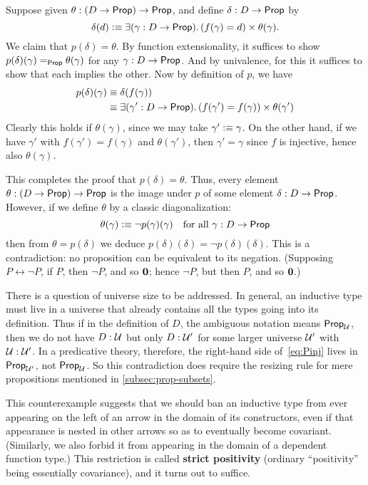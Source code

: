 Suppose given $\theta:(D\to\mathsf{Prop})\to\mathsf{Prop}$, and define $\delta:D\to\mathsf{Prop}$ by
\begin{equation}
  \delta(d) \defeq \exis{\gamma:D\to\prop} (f(\gamma) = d) \times \theta(\gamma).\label{eq:Pinj}
\end{equation}
We claim that $p(\delta)=\theta$.
By function extensionality, it suffices to show $p(\delta)(\gamma) =_\mathsf{Prop} \theta(\gamma)$ for any $\gamma:D\to\mathsf{Prop}$.
And by univalence, for this it suffices to show that each implies the other.
Now by definition of $p$, we have
\begin{align*}
  p(\delta)(\gamma) &\jdeq \delta(f(\gamma))\\
  &\jdeq \exis{\gamma':D\to\prop} (f(\gamma') = f(\gamma)) \times \theta(\gamma')
\end{align*}
Clearly this holds if $\theta(\gamma)$, since we may take $\gamma'\vcentcolon\equiv \gamma$.
On the other hand, if we have $\gamma'$ with $f(\gamma') = f(\gamma)$ and $\theta(\gamma')$, then $\gamma'=\gamma$ since $f$ is injective, hence also $\theta(\gamma)$.

This completes the proof that $p(\delta)=\theta$.
Thus, every element $\theta:(D\to\mathsf{Prop})\to\mathsf{Prop}$ is the image under $p$ of some element $\delta:D\to\mathsf{Prop}$.
However, if we define $\theta$ by a classic diagonalization:
\[ \theta(\gamma) \vcentcolon\equiv \neg p(\gamma)(\gamma) \quad\text{for all $\gamma:D\to\mathsf{Prop}$} \]
then from $\theta = p(\delta)$ we deduce $p(\delta)(\delta) = \neg p(\delta)(\delta)$.
This is a contradiction: no proposition can be equivalent to its negation.
(Supposing $P\leftrightarrow \neg P$, if $P$, then $\neg P$, and so $\mathbf{0}$; hence $\neg P$, but then $P$, and so $\mathbf{0}$.)

\begin{rmk}
  There is a question of universe size to be addressed.
  In general, an inductive type must live in a universe that already contains all the types going into its definition.
  Thus if in the definition of $D$, the ambiguous notation \prop means $\mathsf{Prop}_{\mathcal{U}}$, then we do not have $D:\mathcal{U}$ but only $D:\mathcal{U}'$ for some larger universe $\mathcal{U}'$ with $\mathcal{U}:\mathcal{U}'$.
  In a predicative theory, therefore, the right-hand side of~\eqref{eq:Pinj} lives in $\mathsf{Prop}_{\mathcal{U}'}$, not $\mathsf{Prop}_\mathcal{U}$.
  So this contradiction does require the resizing rule for mere propositions mentioned in \autoref{subsec:prop-subsets}.
\end{rmk}

This counterexample suggests that we should ban an inductive type from ever appearing on the left of an arrow in the domain of its constructors, even if that appearance is nested in other arrows so as to eventually become covariant.
(Similarly, we also forbid it from appearing in the domain of a dependent function type.)
This restriction is called \textbf{strict positivity} (ordinary ``positivity'' being essentially covariance), and it turns out to suffice.

